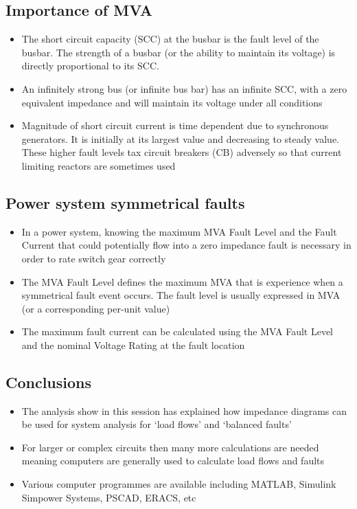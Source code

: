 \subsection{Importance of MVA}
\begin{itemize}
	\item The short circuit capacity (SCC) at the busbar is the fault level of the busbar. The strength of a busbar (or the ability to maintain its voltage) is directly proportional to its SCC.
	\item An infinitely strong bus (or infinite bus bar) has an infinite SCC, with a zero equivalent impedance and will maintain its voltage under all conditions
	\item Magnitude of short circuit current is time dependent due to synchronous generators. It is initially at its largest value and decreasing to steady value. These higher fault levels tax circuit breakers (CB) adversely so that current limiting reactors are sometimes used
\end{itemize}
\subsection{Power system symmetrical faults}
\begin{itemize}
	\item In a power system, knowing the maximum MVA Fault Level and the Fault Current that could potentially flow into a zero impedance fault is necessary in order to rate switch gear correctly
	\item The MVA Fault Level defines the maximum MVA that is experience when a symmetrical fault event occurs. The fault level is usually expressed in MVA (or a corresponding per-unit value)
	\item The maximum fault current can be calculated using the MVA Fault Level and the nominal Voltage Rating at the fault location
\end{itemize}
\subsection{Conclusions}
\begin{itemize}
	\item The analysis show in this session has explained how impedance diagrams can be used for system analysis for `load flows' and `balanced faults'
	\item For larger or complex circuits then many more calculations are needed meaning computers are generally used to calculate load flows and faults
	\item Various computer programmes are available including MATLAB, Simulink Simpower Systems, PSCAD, ERACS, etc
\end{itemize}














